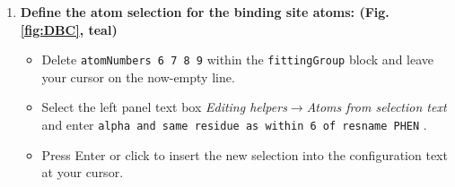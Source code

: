 \documentclass[9pt,tutorial]{Styling/livecoms}
\newcommand{\button}[1]{
  \inlineBox[gray]{\texttt{#1}}
}
\newcommand{\menu}[1]{
  \textit{#1}
}
\newcommand{\textInput}[1]{
  \texttt{#1}
}
\begin{document}
\begin{enumerate}
\begin{enumerate}[label=\alph*., ref=\theenumi.\alph*]
            \item \label{step:siteNumbers}\textbf{Define the atom selection for the binding site atoms: (Fig. \ref{fig:DBC}, teal)} 
             \begin{itemize}
                 \item Delete \textInput{atomNumbers 6 7 8 9} within the \textInput{fittingGroup} block and leave your cursor on the now-empty line.
                 \item Select the left panel text box \menu{Editing helpers$\rightarrow$Atoms from selection text} and enter \textInput{alpha and same residue as within 6 of resname PHEN}.
                 \item Press Enter or click \button{Insert [Enter]} to insert the new selection into the configuration text at your cursor.
            \end{itemize}
        

\end{enumerate}
\end{enumerate}
\end{document}
